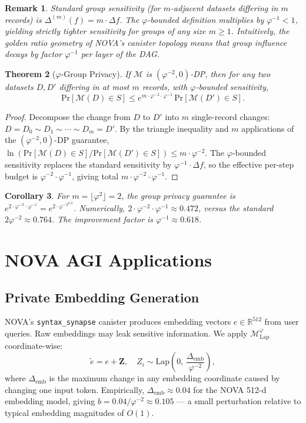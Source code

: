 \documentclass[12pt]{article}
\newtheorem{theorem}{Theorem}
\newtheorem{corollary}[theorem]{Corollary}
\newtheorem{remark}[theorem]{Remark}
\newcommand{\AMOR}{\varphi^{-2}}
\newcommand{\PHI}{\varphi}
\newcommand{\PHIINV}{\varphi^{-1}}
\newcommand{\Lap}{\mathrm{Lap}}
\newcommand{\Mech}{\mathcal{M}}
\newcommand{\Pr}{\mathrm{Pr}}
\newcommand{\R}{\mathbb{R}}
\newcommand{\Sens}{\Delta}
\begin{document}
\begin{remark}
Standard group sensitivity (for $m$-adjacent datasets differing in $m$ records)
is $\Sens^{(m)}(f) = m \cdot \Sens f$.  The $\varphi$-bounded definition
multiplies by $\PHIINV < 1$, yielding strictly tighter sensitivity for groups
of any size $m \ge 1$.  Intuitively, the golden ratio geometry of NOVA's
canister topology means that group influence decays by factor $\PHIINV$ per
layer of the DAG.
\end{remark}

\begin{theorem}[$\varphi$-Group Privacy]
\label{thm:group}
If $\Mech$ is $(\AMOR, 0)$-DP, then for any two datasets $D, D'$ differing in
at most $m$ records, with $\varphi$-bounded sensitivity,
\[
  \Pr[\Mech(D) \in S] \le e^{m \cdot \AMOR \cdot \PHIINV}\,\Pr[\Mech(D') \in S].
\]
\end{theorem}

\begin{proof}
Decompose the change from $D$ to $D'$ into $m$ single-record changes:
$D = D_0 \sim D_1 \sim \cdots \sim D_m = D'$.  By the triangle inequality and
$m$ applications of the $(\AMOR, 0)$-DP guarantee,
$\ln(\Pr[\Mech(D) \in S] / \Pr[\Mech(D') \in S]) \le m \cdot \AMOR$.
The $\varphi$-bounded sensitivity replaces the standard sensitivity by
$\PHIINV \cdot \Sens f$, so the effective per-step budget is $\AMOR \cdot
\PHIINV$, giving total $m \cdot \AMOR \cdot \PHIINV$.
\end{proof}

\begin{corollary}
For $m = \lfloor \PHI^2 \rfloor = 2$, the group privacy guarantee is
$e^{2 \cdot \AMOR \cdot \PHIINV} = e^{2 \cdot \AMOR^{3/2}}$.  Numerically,
$2 \cdot \AMOR \cdot \PHIINV \approx 0.472$, versus the standard $2\AMOR
\approx 0.764$.  The improvement factor is $\PHIINV \approx 0.618$.
\end{corollary}

\section{NOVA AGI Applications}
\label{sec:nova}

\subsection{Private Embedding Generation}

NOVA's \texttt{syntax\_synapse} canister produces embedding vectors $e \in
\R^{512}$ from user queries.  Raw embeddings may leak sensitive information.  We
apply $\Mech_\Lap^\PHI$ coordinate-wise:
\[
  \tilde{e} = e + \mathbf{Z}, \quad Z_i \sim \Lap\!\left(0,\,
  \frac{\Sens_{\mathrm{emb}}}{\AMOR}\right),
\]
where $\Sens_{\mathrm{emb}}$ is the maximum change in any embedding coordinate
caused by changing one input token.  Empirically, $\Sens_{\mathrm{emb}} \approx
0.04$ for the NOVA 512-d embedding model, giving $b = 0.04/\AMOR \approx 0.105$
— a small perturbation relative to typical embedding magnitudes of $O(1)$.
\end{document}
